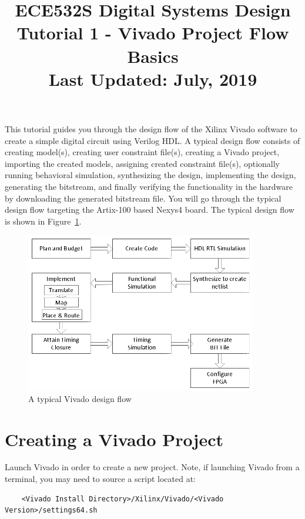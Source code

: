 \documentclass[11pt]{article}
\title{ECE532S Digital Systems Design \\ \vspace{0.4cm}
       \Large Tutorial 1 - Vivado Project Flow Basics \\ \vspace{0.4cm}
       \small Last Updated: July, 2019}
\author{ }
\date{ }
\begin{document}
\maketitle
\vspace{-1cm}

This tutorial guides you through the design flow of the Xilinx Vivado software to create a simple digital circuit using Verilog HDL. A typical design flow consists of creating model(s), creating user constraint file(s), creating a Vivado project, importing the created models, assigning created constraint file(s), optionally running behavioral simulation, synthesizing the design, implementing the design, generating the bitstream, and finally verifying the functionality in the hardware by downloading the generated bitstream file. You will go through the typical design flow targeting the Artix-100 based Nexys4 board. The typical design flow is shown in Figure~\ref{fig:design_flow}.

\begin{figure}[!h]
    \centering
    \includegraphics[width=0.9\textwidth]{images/design_flow.png}
    \caption{A typical Vivado design flow}
    \label{fig:design_flow}
\end{figure}




\section{Creating a Vivado Project}
\label{sec:create_proj}
Launch Vivado in order to create a new project. Note, if launching Vivado from a terminal, you may need to source a script located at:

\begin{verbatim}
    <Vivado Install Directory>/Xilinx/Vivado/<Vivado Version>/settings64.sh
\end{verbatim}
\end{document}
